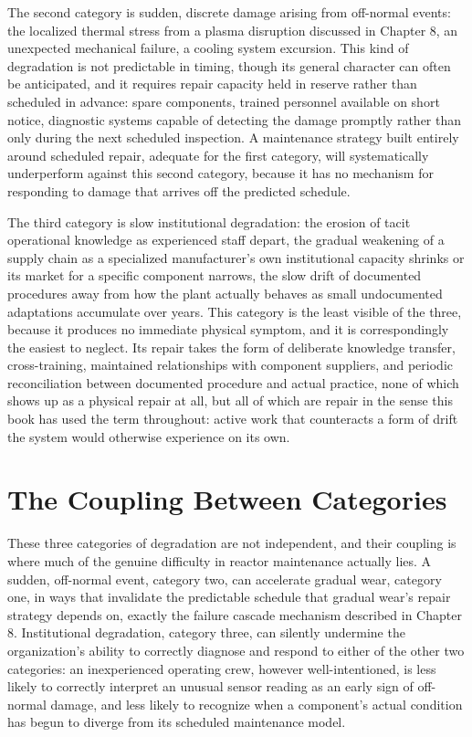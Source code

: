 The second category is sudden, discrete damage arising from off-normal events: the localized thermal stress from a plasma disruption discussed in Chapter 8, an unexpected mechanical failure, a cooling system excursion. This kind of degradation is not predictable in timing, though its general character can often be anticipated, and it requires repair capacity held in reserve rather than scheduled in advance: spare components, trained personnel available on short notice, diagnostic systems capable of detecting the damage promptly rather than only during the next scheduled inspection. A maintenance strategy built entirely around scheduled repair, adequate for the first category, will systematically underperform against this second category, because it has no mechanism for responding to damage that arrives off the predicted schedule.

The third category is slow institutional degradation: the erosion of tacit operational knowledge as experienced staff depart, the gradual weakening of a supply chain as a specialized manufacturer's own institutional capacity shrinks or its market for a specific component narrows, the slow drift of documented procedures away from how the plant actually behaves as small undocumented adaptations accumulate over years. This category is the least visible of the three, because it produces no immediate physical symptom, and it is correspondingly the easiest to neglect. Its repair takes the form of deliberate knowledge transfer, cross-training, maintained relationships with component suppliers, and periodic reconciliation between documented procedure and actual practice, none of which shows up as a physical repair at all, but all of which are repair in the sense this book has used the term throughout: active work that counteracts a form of drift the system would otherwise experience on its own.

\section{The Coupling Between Categories}

These three categories of degradation are not independent, and their coupling is where much of the genuine difficulty in reactor maintenance actually lies. A sudden, off-normal event, category two, can accelerate gradual wear, category one, in ways that invalidate the predictable schedule that gradual wear's repair strategy depends on, exactly the failure cascade mechanism described in Chapter 8. Institutional degradation, category three, can silently undermine the organization's ability to correctly diagnose and respond to either of the other two categories: an inexperienced operating crew, however well-intentioned, is less likely to correctly interpret an unusual sensor reading as an early sign of off-normal damage, and less likely to recognize when a component's actual condition has begun to diverge from its scheduled maintenance model.

